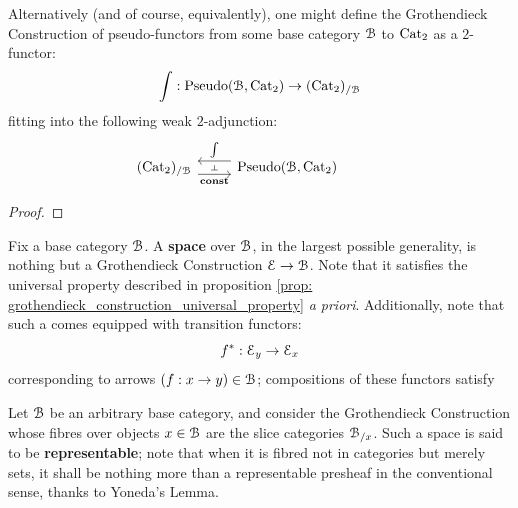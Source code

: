                 \begin{proposition} \label{prop: grothendieck_construction_universal_property}
                    Alternatively (and of course, equivalently), one might define the Grothendieck Construction of pseudo-functors from some base category $\mathcal{B}$ to $\mathrm{Cat}_2$ as a $2$-functor:
                        $$\int: \mathrm{Pseudo}(\mathcal{B}, \mathrm{Cat}_2) \to (\mathrm{Cat}_2)_{/\mathcal{B}}$$
                    fitting into the following weak $2$-adjunction:
                        $$
                            \begin{tikzcd}
                            	{(\Cat_2)_{/\calB}} & {\Pseudo(\calB, \Cat_2)} & {}
                            	\arrow[""{name=0, anchor=center, inner sep=0}, "\const"', shift right=2, from=1-1, to=1-2]
                            	\arrow[""{name=1, anchor=center, inner sep=0}, "\int"', shift right=2, from=1-2, to=1-1]
                            	\arrow["\dashv"{anchor=center, rotate=-90}, draw=none, from=1, to=0]
                            \end{tikzcd}
                        $$
                \end{proposition}
                    \begin{proof}
                        
                    \end{proof}
                \begin{corollary} \label{coro: grothendieck_constructions_are_oplax_colimits}
                    
                \end{corollary}
                
                \begin{definition}[Spaces] \label{def: spaces}
                    Fix a base category $\mathcal{B}$. A \textbf{space} over $\mathcal{B}$, in the largest possible generality, is nothing but a Grothendieck Construction $\mathcal{E} \to \mathcal{B}$. Note that it satisfies the universal property described in proposition \ref{prop: grothendieck_construction_universal_property} \textit{a priori}. Additionally, note that such a  comes equipped with transition functors:
                        $$f^*: \mathcal{E}_y \to \mathcal{E}_x$$
                    corresponding to arrows $(f: x \to y) \in \mathcal{B}$; compositions of these functors satisfy 
                \end{definition}
                \begin{example} \label{exmaple: representable_spaces}
                    Let $\mathcal{B}$ be an arbitrary base category, and consider the Grothendieck Construction whose fibres over objects $x \in \mathcal{B}$ are the slice categories $\mathcal{B}_{/x}$. Such a space is said to be \textbf{representable}; note that when it is fibred not in categories but merely sets, it shall be nothing more than a representable presheaf in the conventional sense, thanks to Yoneda's Lemma.
                \end{example}
                
